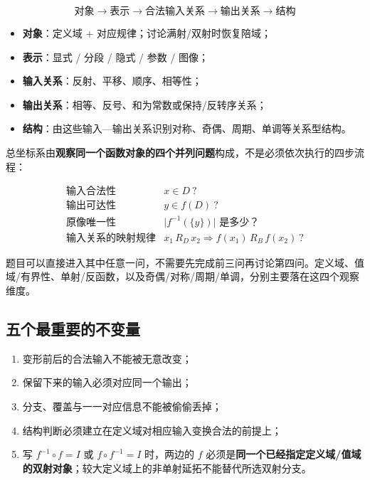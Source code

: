 \documentclass[11pt,a4paper]{ctexart}
\providecommand{\tightlist}{}
\begin{document}
\[
\boxed{
\text{对象}
\to
\text{表示}
\to
\text{合法输入关系}
\to
\text{输出关系}
\to
\text{结构}
}
\]

\begin{itemize}
\tightlist
\item
  \textbf{对象}：定义域 + 对应规律；讨论满射/双射时恢复陪域；
\item
  \textbf{表示}：显式 / 分段 / 隐式 / 参数 / 图像；
\item
  \textbf{输入关系}：反射、平移、顺序、相等性；
\item
  \textbf{输出关系}：相等、反号、和为常数或保持/反转序关系；
\item
  \textbf{结构}：由这些输入—输出关系识别对称、奇偶、周期、单调等关系型结构。
\end{itemize}

总坐标系由\textbf{观察同一个函数对象的四个并列问题}构成，不是必须依次执行的四步流程：

\[
\boxed{
\begin{array}{ll}
\text{输入合法性} & x\in D\ ?\\[2mm]
\text{输出可达性} & y\in f(D)\ ?\\[2mm]
\text{原像唯一性} & \lvert f^{-1}(\{y\})\rvert\text{ 是多少？}\\[2mm]
\text{输入关系的映射规律} & x_1\,R_D\,x_2\Rightarrow f(x_1)\,R_B\,f(x_2)\ ?
\end{array}
}
\]

题目可以直接进入其中任意一问，不需要先完成前三问再讨论第四问。定义域、值域/有界性、单射/反函数，以及奇偶/对称/周期/单调，分别主要落在这四个观察维度。

\subsection{五个最重要的不变量}\label{ux56dbux4e2aux6700ux91cdux8981ux7684ux4e0dux53d8ux91cf}

\begin{enumerate}
\def\labelenumi{\arabic{enumi}.}
\tightlist
\item
  变形前后的合法输入不能被无意改变；
\item
  保留下来的输入必须对应同一个输出；
\item
  分支、覆盖与一一对应信息不能被偷偷丢掉；
\item
  结构判断必须建立在定义域对相应输入变换合法的前提上；
\item
  写 \(f^{-1}\circ f=I\) 或 \(f\circ f^{-1}=I\) 时，两边的 \(f\) 必须是\textbf{同一个已经指定定义域/值域的双射对象}；较大定义域上的非单射延拓不能替代所选双射分支。
\end{enumerate}
\end{document}

